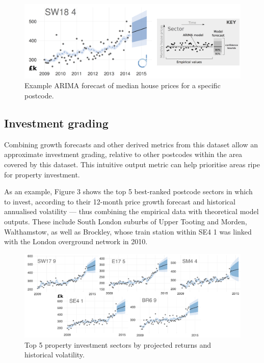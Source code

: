 \documentclass[
10pt, %
a4paper, %
oneside, %
headinclude,footinclude, %
BCOR5mm, %
]{scrartcl}
\begin{document}
\begin{figure}[h]
\begin{center}
\includegraphics[width=.9\textwidth]{Figures/arima.png}
\caption{Example ARIMA forecast of median house prices for a specific postcode.}
\end{center}
\end{figure}

\vspace{-1em}
\subsection*{Investment grading}

Combining growth forecasts and other derived metrics from this
dataset allow an approximate investment grading, relative to other
postcodes within the area covered by this dataset. This intuitive
output metric can help prioritise areas ripe for property investment.

As an example, Figure 3 shows the top 5 best-ranked postcode sectors
in which to invest, according to their 12-month price growth forecast
and historical annualised volatility --- thus combining the empirical
data with theoretical model outputs. These include South London
suburbs of Upper Tooting and Morden, Walthamstow, as well as Brockley,
whose train station within SE4 1 was linked with the London overground network in 2010.\\

\begin{figure}[h]
\begin{center}
\includegraphics[width=.9\textwidth]{Figures/t5.pdf}
\caption{Top 5 property investment sectors by projected returns and historical volatility.}
\end{center}
\end{figure}
\end{document}
